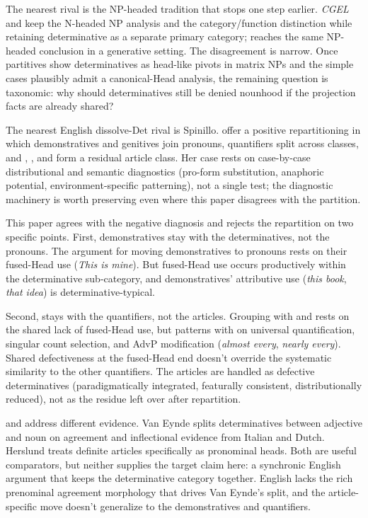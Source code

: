 \documentclass[12pt]{article}
\begin{document}
The nearest rival is the NP-headed tradition that stops one step earlier. \textit{CGEL} and \textcite{pullummiller2022nps} keep the N-headed NP analysis and the category/function distinction while retaining determinative as a separate primary category; \textcite{bruening2020nominal} reaches the same NP-headed conclusion in a generative setting. The disagreement is narrow. Once partitives show determinatives as head-like pivots in matrix NPs and the simple cases plausibly admit a canonical-Head analysis, the remaining question is taxonomic: why should determinatives still be denied nounhood if the projection facts are already shared?

The nearest English dissolve-Det rival is Spinillo. \textcite{spinillo2000determiners,spinillo2004reconceptualising} offer a positive repartitioning in which demonstratives and genitives join pronouns, quantifiers split across classes, and , , and  form a residual article class. Her case rests on case-by-case distributional and semantic diagnostics (pro-form substitution, anaphoric potential, environment-specific patterning), not a single test; the diagnostic machinery is worth preserving even where this paper disagrees with the partition.

This paper agrees with the negative diagnosis and rejects the repartition on two specific points. First, demonstratives stay with the determinatives, not the pronouns. The argument for moving demonstratives to pronouns rests on their fused-Head use (\textit{This is mine}). But fused-Head use occurs productively within the determinative sub-category, and demonstratives' attributive use (\textit{this book}, \textit{that idea}) is determinative-typical.

Second,  stays with the quantifiers, not the articles. Grouping  with  and  rests on the shared lack of fused-Head use, but  patterns with  on universal quantification, singular count selection, and AdvP modification (\textit{almost every}, \textit{nearly every}). Shared defectiveness at the fused-Head end doesn't override the systematic similarity to the other quantifiers. The articles are handled as defective determinatives (paradigmatically integrated, featurally consistent, distributionally reduced), not as the residue left over after repartition.

\textcite{vaneynde2003determiner} and \textcite{herslund2008articles} address different evidence. Van Eynde splits determinatives between adjective and noun on agreement and inflectional evidence from Italian and Dutch. Herslund treats definite articles specifically as pronominal heads. Both are useful comparators, but neither supplies the target claim here: a synchronic English argument that keeps the determinative category together. English lacks the rich prenominal agreement morphology that drives Van Eynde's split, and the article-specific move doesn't generalize to the demonstratives and quantifiers.
\end{document}
